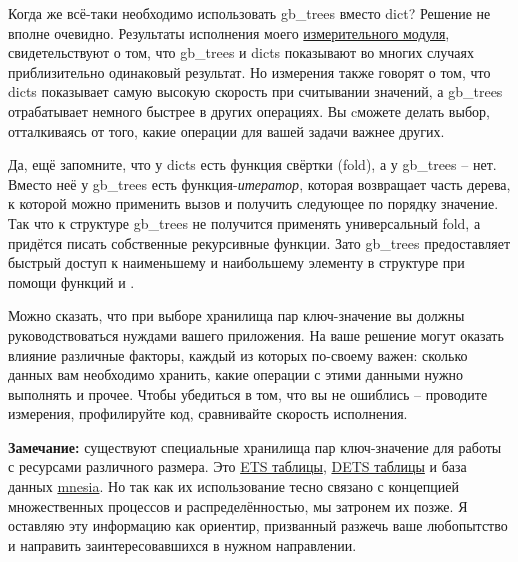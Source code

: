 Когда же всё\--таки необходимо использовать gb\_trees вместо dict?
Решение не вполне очевидно.
Результаты исполнения моего \href{http://learnyousomeerlang.com/static/erlang/keyval\_benchmark.erl}{измерительного модуля}, свидетельствуют о том, что gb\_trees и dicts показывают во многих случаях приблизительно одинаковый результат.
Но измерения также говорят о том, что dicts показывает самую высокую скорость при считывании значений, а gb\_trees отрабатывает немного быстрее в других операциях.
Вы cможете делать выбор, отталкиваясь от того, какие операции для вашей задачи важнее других.

Да, ещё запомните, что у dicts есть функция свёртки (fold), а у gb\_trees \--- нет.
Вместо неё у gb\_trees есть функция\--\emph{итератор}, которая возвращает часть дерева, к которой можно применить вызов  и получить следующее по порядку значение.
Так что к структуре gb\_trees не получится применять универсальный fold, а придётся писать собственные рекурсивные функции.
Зато gb\_trees предоставляет быстрый доступ к наименьшему и наибольшему элементу в структуре при помощи функций  и .

Можно сказать, что при выборе хранилища пар ключ\--значение вы должны руководствоваться нуждами вашего приложения.
На ваше решение могут оказать влияние различные факторы, каждый из которых по\--своему важен: сколько данных вам необходимо хранить, какие операции с этими данными нужно выполнять и прочее.
Чтобы убедиться в том, что вы не ошиблись \--- проводите измерения, профилируйте код, сравнивайте скорость исполнения.\\
\colorbox{lgray}
{
\begin{minipage}{1.0\linewidth}
    \textbf{Замечание:} существуют специальные хранилища пар ключ\--значение для работы с ресурсами различного размера.
    Это \href{http://erldocs.com/R15B/stdlib/ets.html}{ETS таблицы}, \href{http://erldocs.com/R15B/stdlib/dets.html}{DETS таблицы} и база данных \href{http://erldocs.com/R15B/mnesia/mnesia.html?search=mnesia&i=0}{mnesia}.
    Но так как их использование тесно связано с концепцией множественных процессов и распределённостью, мы затронем их позже.
    Я оставляю эту информацию как ориентир, призванный разжечь ваше любопытство и направить заинтересовавшихся в нужном направлении.
\end{minipage}
}
